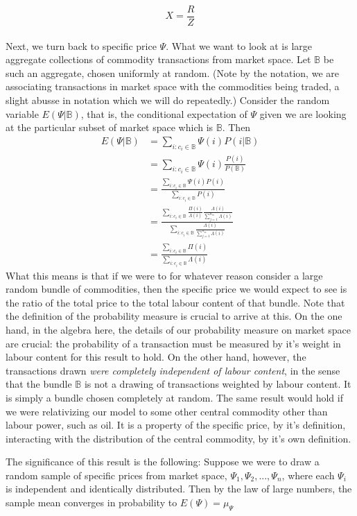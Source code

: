 \[ X = \frac{R}{Z} \]
\\
Next, we turn back to specific price $\Psi$. What we want to look at is large aggregate collections of commodity transactions from market space. Let $\mathbb{B}$ be such an aggregate, chosen uniformly at random. (Note by the notation, we are associating transactions in market space with the commodities being traded, a slight abusse in notation which we will do repeatedly.) Consider the random variable $E(\Psi|\mathbb{B})$, that is, the conditional expectation of $\Psi$ given we are looking at the particular subset of market space which is $\mathbb{B}$. Then
\begin{align}
	E(\Psi|\mathbb{B}) &= \sum_{i: c_i \in \mathbb{B}}\Psi(i)P(i|\mathbb{B}) \\
						&= \sum_{i: c_i \in \mathbb{B}} \Psi(i)\frac{P(i)}{P(\mathbb{B})} \\
						&=\frac{\sum_{i: c_i \in \mathbb{B}} \Psi(i)P(i)}{\sum_{i: c_i \in \mathbb{B}}P(i)} \\
						&= \frac{\sum_{i: c_i \in \mathbb{B}} \frac{\Pi(i)}{\Lambda(i)}\frac{\Lambda(i)}{\sum_{j = 1}^{n_m}\Lambda(i)}}{\sum_{i: c_i \in \mathbb{B}}\frac{\Lambda(i)}{\sum_{j = 1}^{n_m}\Lambda(i)}} \\
						&= \frac{\sum_{i: c_i \in \mathbb{B}} \Pi(i)}{\sum_{i: c_i \in \mathbb{B}} \Lambda(i)}
\end{align}
What this means is that if we were to for whatever reason consider a large random bundle of commodities, then the specific price we would expect to see is the ratio of the total price to the total labour content of that bundle. Note that the definition of the probability measure is crucial to arrive at this. On the one hand, in the algebra here, the details of our probability measure on market space are crucial: the probability of a transaction must be measured by it's weight in labour content for this result to hold. On the other hand, however, the transactions drawn \textit{were completely independent of labour content}, in the sense that the bundle $\mathbb{B}$ is not a drawing of transactions weighted by labour content. It is simply a bundle chosen completely at random. The same result would hold if we were relativizing our model to some other central commodity other than labour power, such as oil. It is a property of the specific price, by it's definition, interacting with the distribution of the central commodity, by it's own definition. \par 
The significance of this result is the following: Suppose we were to draw a random sample of specific prices from market space, $\Psi_1,\Psi_2,...,\Psi_n$, where each $\Psi_i$ is independent and identically distributed. Then by the law of large numbers, the sample mean converges in probability to $E(\Psi) = \mu_{\Psi}$
